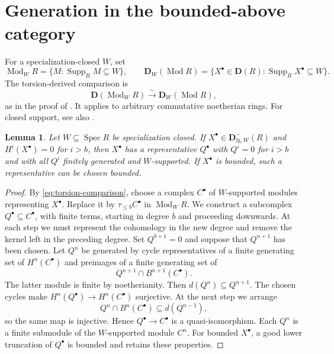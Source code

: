 \documentclass[11pt]{amsart}
\numberwithin{equation}{section}
\newtheorem{lemma}[theorem]{Lemma}
\theoremstyle{definition}
\theoremstyle{remark}
\DeclareMathOperator{\Supp}{Supp}
\DeclareMathOperator{\Spec}{Spec}
\newcommand{\D}{\mathbf D}
\newcommand{\fg}{\mathrm{fg}}
\newcommand{\Mod}{\operatorname{Mod}}
\begin{document}
\section{Generation in the bounded-above category}

For a specialization-closed $W$, set
\[
 \Mod_W R=\{M:\Supp_R M\subseteq W\},\qquad
 \D_W(\Mod R)=\{X^{\bullet}\in\D(R):\Supp_R X^{\bullet}\subseteq W\}.
\]
The torsion-derived comparison is
\begin{equation}\label{eq:torsion-comparison}
 \D(\Mod_W R)\xrightarrow{\sim}\D_W(\Mod R),
\end{equation}
as in the proof of \cite[Theorem~9.1]{BIK08}. It applies to arbitrary
commutative noetherian rings. For closed support, see also
\cite[Lemma~47.10.1, Tag~0955]{Stacks}.

\begin{lemma}\label{lem:negative-model}
Let $W\subseteq\Spec R$ be specialization closed.
If $X^{\bullet}\in\D^-_{\fg,W}(R)$ and $H^i(X^{\bullet})=0$ for $i>b$, then $X^{\bullet}$ has a representative
$Q^{\bullet}$ with $Q^i=0$ for $i>b$ and with all $Q^i$ finitely generated and
$W$-supported. If $X^{\bullet}$ is bounded, such a representative can be chosen
bounded.
\end{lemma}
\begin{proof}
By \eqref{eq:torsion-comparison}, choose a complex $C^{\bullet}$ of $W$-supported
modules representing $X^{\bullet}$. Replace it by $\tau_{\leq b}C^{\bullet}$ in
$\Mod_W R$. We construct a subcomplex $Q^{\bullet}\subseteq C^{\bullet}$, with finite terms,
starting in degree $b$ and proceeding downwards. At each step we must
represent the cohomology in the new degree and remove the kernel left
in the preceding degree. Set $Q^{b+1}=0$ and suppose that $Q^{n+1}$
has been chosen.
Let $Q^n$ be generated by cycle representatives of a finite
generating set of $H^n(C^{\bullet})$ and preimages of a finite generating set of
\[
 Q^{n+1}\cap B^{n+1}(C^{\bullet}).
\]
The latter module is finite by noetherianity. Then $d(Q^n)\subseteq Q^{n+1}$.
The chosen cycles make $H^n(Q^{\bullet})\to H^n(C^{\bullet})$
surjective. At the next step we arrange
\[
 Q^n\cap B^n(C^{\bullet})\subseteq d(Q^{n-1}),
\]
so the same map is injective. Hence $Q^{\bullet}\to C^{\bullet}$
is a quasi-isomorphism. Each $Q^n$ is a finite submodule of the
$W$-supported module $C^n$.
For bounded $X^{\bullet}$, a good lower truncation of $Q^{\bullet}$ is bounded and retains
these properties.
\end{proof}
\end{document}
